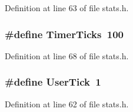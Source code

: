 Definition at line 63 of file stats.\+h.

\subsubsection[{Timer\+Ticks}]{\setlength{\rightskip}{0pt plus 5cm}\#define Timer\+Ticks~100}\label{stats_8h_ab66f8984a291e152587d29218248e9aa}


Definition at line 68 of file stats.\+h.

\subsubsection[{User\+Tick}]{\setlength{\rightskip}{0pt plus 5cm}\#define User\+Tick~1}\label{stats_8h_a00fab0e666544620e63085a7b8e3781d}


Definition at line 62 of file stats.\+h.

